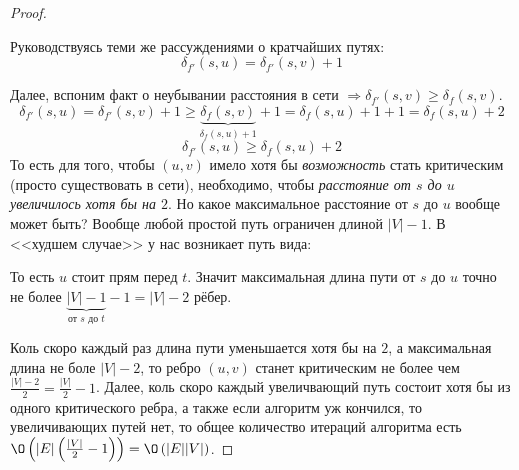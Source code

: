 \begin{proof}
\begin{figure}[h]
    \end{figure}

    Руководствуясь теми же рассуждениями о кратчайших путях:
    \begin{equation*}
        \delta_{f'}(s, u) = \delta_{f'}(s, v) + 1
    \end{equation*}

    Далее, вспоним факт о неубывании расстояния в сети $\Rightarrow \delta_{f'}(s, v) \geq \delta_{f}(s, v)$.
    \begin{equation*}
        \delta_{f'}(s, u) = \delta_{f'}(s, v) + 1 \geq \underbrace{\delta_{f}(s, v)}_{\delta_{f}(s, u) + 1} + 1 = \delta_{f}(s, u) + 1 + 1 = \delta_{f}(s, u) + 2
    \end{equation*}
    \begin{equation*}
        \delta_{f'}(s, u) \geq \delta_{f}(s, u) + 2
    \end{equation*}
    То есть для того, чтобы $(u, v)$ имело хотя бы \textit{возможность} стать критическим (просто существовать в сети), необходимо, чтобы \textit{расстояние от $s$ до $u$ увеличилось хотя бы на $2$}.
    Но какое максимальное расстояние от $s$ до $u$ вообще может быть? Вообще любой простой путь ограничен длиной $|V| - 1$. В <<худшем случае>> у нас возникает путь вида:
    \begin{figure}[h]
        \centering
    \end{figure}

    То есть $u$ стоит прям перед $t$. Значит максимальная длина пути от $s$ до $u$ точно не более $\underbrace{|V| - 1}_{\text{от $s$ до $t$}} - 1 = |V| - 2$ рёбер.

    Коль скоро каждый раз длина пути уменьшается хотя бы на $2$, а максимальная длина не боле $|V| - 2$, то ребро $(u, v)$ станет критическим не более чем $\frac{|V| - 2}{2} = \frac{|V|}{2} - 1$.
    Далее, коль скоро каждый увеличвающий путь состоит хотя бы из одного критического ребра, а также если алгоритм уж кончился, то увеличивающих путей нет, то общее количество итераций алгоритма есть $\O\left(|E| \left( \frac{|V|}{2} - 1 \right) \right) = \O\left(|E| |V| \right)$.

\end{proof}

